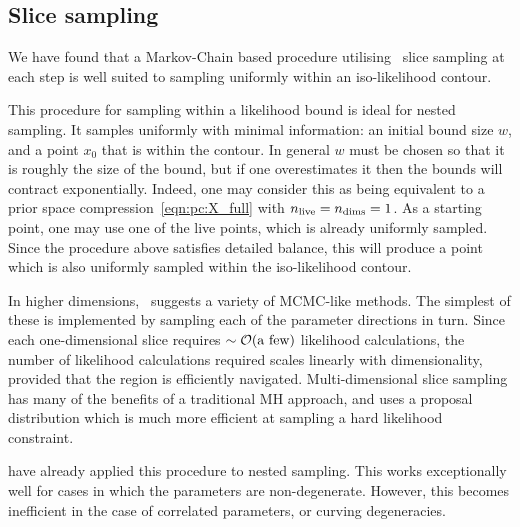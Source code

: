 \subsection{Slice sampling}
\label{sec:bay:slice_sampling}
We have found that a Markov-Chain based procedure utilising~ slice sampling at each step is well suited to sampling uniformly within an iso-likelihood contour.

This procedure for sampling within a likelihood bound is ideal for nested sampling. It samples uniformly with minimal information: an initial bound size \(w\), and a point \(x_0\) that is within the contour. In general \(w\) must be chosen so that it is roughly the size of the bound, but if one overestimates it then the bounds will contract exponentially. Indeed, one may consider this as being equivalent to a prior space compression~\eqref{eqn:pc:X_full} with \(n_{\mathrm{live}}=n_{\mathrm{dims}}=1\). As a starting point, one may use one of the live points, which is already uniformly sampled. Since the procedure above satisfies detailed balance, this will produce a point which is also uniformly sampled within the iso-likelihood contour.

In higher dimensions,~\cite{NealSlice} suggests a variety of MCMC-like methods. The simplest of these is implemented by sampling each of the parameter directions in turn. Since each one-dimensional slice requires \({\sim\mathcal{O}{\left(\text{a few}\right)}}\) likelihood calculations, the number of likelihood calculations required scales linearly with dimensionality, provided that the region is efficiently navigated. Multi-dimensional slice sampling has many of the benefits of a traditional MH approach, and uses a proposal distribution which is much more efficient at sampling a hard likelihood constraint.

\cite{SystemsBio} have already applied this procedure to nested sampling. This works exceptionally well for cases in which the parameters are non-degenerate. However, this becomes inefficient in the case of correlated parameters, or curving degeneracies.










